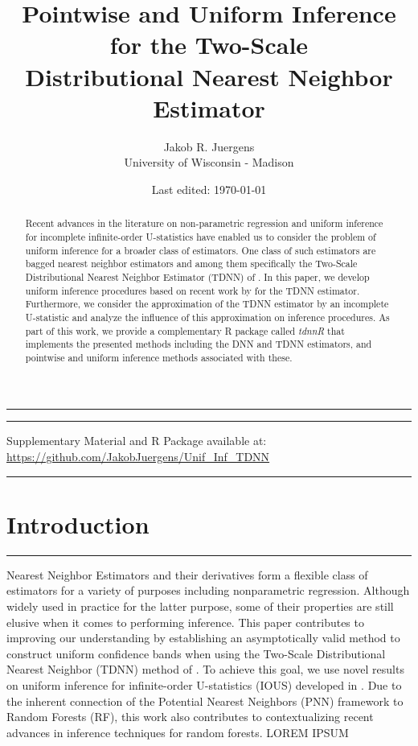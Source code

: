 \documentclass[letterpaper,10pt]{article}
\numberwithin{equation}{section}
\numberwithin{theorem}{section}
\theoremstyle{definition}
\newcommand{\1}{\mathbb{1}}
\begin{document}
\singlespacing
\title{Pointwise and Uniform Inference for the Two-Scale\\ Distributional Nearest Neighbor Estimator}
\date{Last edited: \today}
\author{Jakob R. Juergens \\ University of Wisconsin - Madison}
\maketitle
\hrule
\onehalfspacing
\begin{abstract}
	Recent advances in the literature on non-parametric regression and uniform inference for incomplete infinite-order U-statistics have enabled us to consider the problem of uniform inference for a broader class of estimators.
	One class of such estimators are bagged nearest neighbor estimators and among them specifically the Two-Scale Distributional Nearest Neighbor Estimator (TDNN) of \citet{demirkaya_optimal_2024}.
	In this paper, we develop uniform inference procedures based on recent work by \citet{ritzwoller_uniform_2024} for the TDNN estimator.
	Furthermore, we consider the approximation of the TDNN estimator by an incomplete U-statistic and analyze the influence of this approximation on inference procedures.
	As part of this work, we provide a complementary R package called \textit{tdnnR} that implements the presented methods including the DNN and TDNN estimators, and pointwise and uniform inference methods associated with these.
\end{abstract}
\vspace{0.3cm}
\hrule
\singlespacing

\vspace{-0.3cm}
\begin{center}
	{\small Supplementary Material and R Package available at: \url{https://github.com/JakobJuergens/Unif_Inf_TDNN}}
\end{center}
\vspace{0.3cm}
\hrule
\singlespacing
{\small \tableofcontents}
\thispagestyle{empty}


\newpage
\onehalfspacing
\section{Introduction}
\hrule
Nearest Neighbor Estimators and their derivatives form a flexible class of estimators for a variety of purposes including nonparametric regression.
Although widely used in practice for the latter purpose, some of their properties are still elusive when it comes to performing inference.
This paper contributes to improving our understanding by establishing an asymptotically valid method to construct uniform confidence bands when using the Two-Scale Distributional Nearest Neighbor (TDNN) method of \citet{demirkaya_optimal_2024}.
To achieve this goal, we use novel results on uniform inference for infinite-order U-statistics (IOUS) developed in \citet{ritzwoller_uniform_2024}.
Due to the inherent connection of the Potential Nearest Neighbors (PNN) framework to Random Forests (RF), this work also contributes to contextualizing recent advances in inference techniques for random forests.
	{\color{red} LOREM IPSUM}
\end{document}
